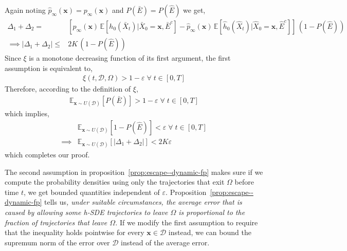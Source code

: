 Again noting $\hat p_\infty(\mathbf x)=p_\infty(\mathbf x)$ and $P(\bar E)=P(\hat E)$ we get,
\begin{align}
    \Delta_1+\Delta_2 = & [p_\infty(\mathbf x)\,\mathbb E[ h_0(\bar X_t)|\bar X_0=\mathbf x, \bar E^c]-\hat p_\infty(\mathbf x)\,\mathbb E[\hat h_0(\hat X_t)|\hat X_0=\mathbf x, \hat E^c]]\,(1-P(\hat E))\\
    \implies|\Delta_1+\Delta_2|\le&2K\,(1-P(\hat E))
\end{align}
Since $\xi$ is a monotone decreasing function of its first argument, the first assumption is equivalent to,
\begin{align}
    \xi(t, \mathcal D, \Omega) > 1-\varepsilon\;\forall\; t\in[0, T]
\end{align}
Therefore, according to the definition of $\xi$,
\begin{align}
    \mathbb E_{\mathbf x\sim U(\mathcal D)}[P(\bar E)] > 1-\varepsilon \;\forall\;t\in[0, T]
\end{align}
which implies,
\begin{align}
    &\mathbb E_{\mathbf x\sim U(\mathcal D)}[1-P(\hat E)] <\varepsilon \;\forall\;t\in[0, T]\\
    \implies&\mathbb E_{\mathbf x\sim U(\mathcal D)}[|\Delta_1+\Delta_2|]<2K\varepsilon
\end{align}
which completes our proof.

The second assumption in proposition~\ref{prop:escape--dynamic-fp} makes sure if we compute the probability densities using only the trajectories that exit $\Omega$ before time $t$, we get bounded quantities independent of $\varepsilon$. Proposition~\ref{prop:escape--dynamic-fp} tells us\textit{, under suitable circumstances, the average error that is caused by allowing some h-SDE trajectories to leave $\Omega$ is proportional to the fraction of trajectories that leave $\Omega$.} If we modify the first assumption to require that the inequality holds pointwise for every $\mathbf x\in\mathcal D$ instead, we can bound the supremum norm of the error over $\mathcal D$ instead of the average error.